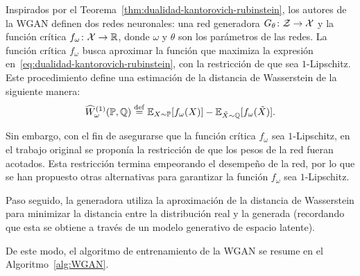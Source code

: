 {{        Inspirados por el Teorema~\ref{thm:dualidad-kantorovich-rubinstein}, los autores de la WGAN definen dos redes neuronales: una red generadora $G_\theta\colon\mathcal{Z}\to\mathcal{X}$ y la función crítica $f_\omega \colon \mathcal{X} \to \mathbb{R}$, donde $\omega$ y $\theta$ son los parámetros de las redes. La función crítica $f_\omega$ busca aproximar la función que maximiza la expresión en~\eqref{eq:dualidad-kantorovich-rubinstein}, con la restricción de que sea $1$-Lipschitz. Este procedimiento define una estimación de la distancia de Wasserstein de la siguiente manera:
        \begin{equation}\label{eq:wasserstein-estimation}
            \widehat W_\omega^{(1)} (\Prob, \ProbQ) \eqdef \Exp_{X\sim \Prob} [f_\omega(X)] - \Exp_{\tilde X \sim \ProbQ} [f_\omega(\tilde X)].
        \end{equation}

        Sin embargo, con el fin de asegurarse que la función crítica $f_\omega$ sea $1$-Lipschitz, en el trabajo original se proponía la restricción de que los pesos de la red fueran acotados. Esta restricción termina empeorando el desempeño de la red, por lo que se han propuesto otras alternativas para garantizar la función $f_\omega$ sea $1$-Lipschitz.

        Paso seguido, la generadora utiliza la aproximación de la distancia de Wasserstein para minimizar la distancia entre la distribución real y la generada (recordando que esta se obtiene a través de un modelo generativo de espacio latente).

        De este modo, el algoritmo de entrenamiento de la WGAN se resume en el Algoritmo~\ref{alg:WGAN}.

}}
